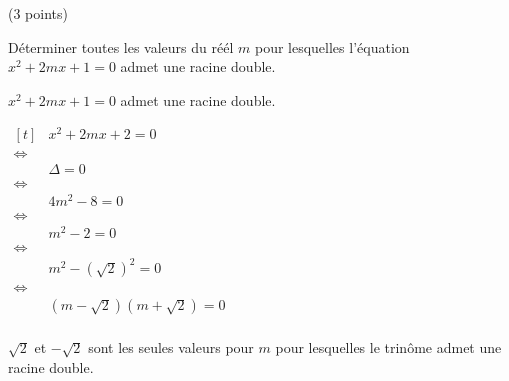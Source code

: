 \documentclass[a4paper,11pt]{article}
\theoremstyle{break}
\begin{document}
  \begin{exo}(3 points)
  
Déterminer toutes les valeurs du réél $m$ pour lesquelles l'équation $x^2+2mx+1=0$ admet une racine double.

\begin{correction}
 $x^2+2mx+1=0$ admet une racine double.
 
 \vspace{0.5cm}
 
$
\begin{aligned}[t]
           & x^2+2mx+2=0 \\ %
      \iff \\
           & \Delta=0\\
      \iff \\
           & 4m^2-8=0\\
      \iff \\
           & m^2-2=0\\
      \iff \\
           & m^2-(\sqrt{2})^2=0\\
      \iff \\
           & (m-\sqrt{2})(m+\sqrt{2})=0\\     
\end{aligned}
$

  $\sqrt{2}$ et $-\sqrt{2}$ sont les seules valeurs pour $m$ pour lesquelles le trin\^ome admet une racine double.
\end{correction}

    
  \end{exo}
  
  
  
  
  
\end{document}
